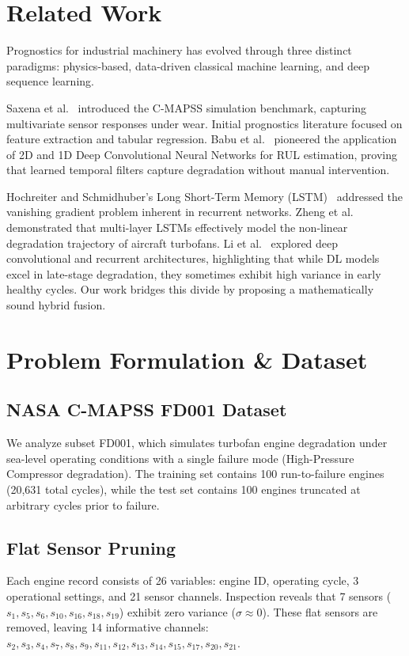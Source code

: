 \documentclass[conference]{IEEEtran}
\begin{document}
\section{Related Work}
Prognostics for industrial machinery has evolved through three distinct paradigms: physics-based, data-driven classical machine learning, and deep sequence learning.

Saxena et al.~\cite{saxena2008} introduced the C-MAPSS simulation benchmark, capturing multivariate sensor responses under wear. Initial prognostics literature focused on feature extraction and tabular regression. Babu et al.~\cite{babu2016} pioneered the application of 2D and 1D Deep Convolutional Neural Networks for RUL estimation, proving that learned temporal filters capture degradation without manual intervention.

Hochreiter and Schmidhuber's Long Short-Term Memory (LSTM)~\cite{hochreiter1997} addressed the vanishing gradient problem inherent in recurrent networks. Zheng et al.~\cite{zheng2017} demonstrated that multi-layer LSTMs effectively model the non-linear degradation trajectory of aircraft turbofans. Li et al.~\cite{li2018} explored deep convolutional and recurrent architectures, highlighting that while DL models excel in late-stage degradation, they sometimes exhibit high variance in early healthy cycles. Our work bridges this divide by proposing a mathematically sound hybrid fusion.

\section{Problem Formulation \& Dataset}
\subsection{NASA C-MAPSS FD001 Dataset}
We analyze subset FD001, which simulates turbofan engine degradation under sea-level operating conditions with a single failure mode (High-Pressure Compressor degradation). The training set contains 100 run-to-failure engines (20,631 total cycles), while the test set contains 100 engines truncated at arbitrary cycles prior to failure.

\subsection{Flat Sensor Pruning}
Each engine record consists of 26 variables: engine ID, operating cycle, 3 operational settings, and 21 sensor channels. Inspection reveals that 7 sensors ($s_1, s_5, s_6, s_{10}, s_{16}, s_{18}, s_{19}$) exhibit zero variance ($\sigma \approx 0$). These flat sensors are removed, leaving 14 informative channels: $s_2, s_3, s_4, s_7, s_8, s_9, s_{11}, s_{12}, s_{13}, s_{14}, s_{15}, s_{17}, s_{20}, s_{21}$.
\end{document}
